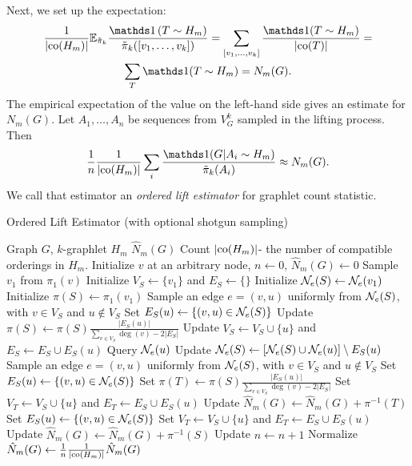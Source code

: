 	Next, we set up the expectation:
	\begin{multline*}
	    \frac{1}{|\co(H_m)|}\E_{\tilde \pi_k} \frac{\ind\left(T \sim H_m\right)}{\tilde\pi_k([v_1, \ldots, v_k])} = 
	    \sum_{[v_1, \ldots, v_k]} \frac{\ind(T \sim H_m)}{|\co(T)|} = \\
	    \sum_T \ind(T \sim H_m) = N_m(G).
	\end{multline*}
	The empirical expectation of the value on the left-hand side gives an estimate for $N_m(G)$.
	Let $A_1,\ldots,A_n$ be sequences from $V^k_G$ sampled in the lifting process.
	Then
	\begin{equation*}
	    \frac{1}{n}\frac{1}{|\co(H_m)|}\sum_{i} \frac{\ind(G|A_i \sim H_m)}{\tilde\pi_k(A_i)} \approx N_m(G).
	\end{equation*}
	We call that estimator an \textit{ordered lift estimator} for graphlet count statistic.
	
\begin{algorithm}[h]
\label{alg:OLE}
\caption{Ordered Lift Estimator (with optional shotgun sampling)}
\begin{algorithmic}
    \INPUT Graph $G$, $k$-graphlet $H_m$
    \OUTPUT $\hat N_m(G)$
    \STATE Count $|\mathrm{co}(H_m)|$- the number of compatible orderings in $H_m$.
    \STATE Initialize $v$ at an arbitrary node, $n \gets 0$, $\hat N_m(G) \gets 0$
        \STATE Sample $v_1$ from $\pi_1(v)$
        \STATE Initialize $V_S \gets \{v_1\}$ and $E_S \gets \{\}$
        \STATE Initialize $\mathcal{N}_e(S)\gets \mathcal{N}_e(v_1)$
        \STATE Initialize $\pi(S) \gets \pi_1(v_1)$
            \STATE Sample an edge $e=(v,u)$ uniformly from $\mathcal{N}_e(S)$, with $v\in V_S$ and $u\notin V_S$
            \STATE Set $E_S(u) \gets \{(v,u)\in \mathcal{N}_e(S)\}$
            \STATE Update $\pi(S)\gets \pi(S)\frac{|E_S(u)|}{\sum_{v\in V_S} \deg(v) - 2|E_S|}$
            \STATE Update $V_S\gets V_S\cup\{u\}$ and $E_S \gets E_S \cup E_S(u)$
            \STATE Query $\mathcal{N}_e(u)$
            \STATE Update $\mathcal{N}_e(S) \gets [\mathcal{N}_e(S)\cup\mathcal{N}_e(u)]\setminus E_S(u)$
        \ENDWHILE
            \STATE Sample an edge $e=(v,u)$ uniformly from $\mathcal{N}_e(S)$, with $v\in V_S$ and $u\notin V_S$
            \STATE Set $E_S(u) \gets \{(v,u)\in \mathcal{N}_e(S)\}$
            \STATE Set $\pi(T)\gets \pi(S)\frac{|E_S(u)|}{\sum_{v\in V_S} \deg(v) - 2|E_S|}$
            \STATE Set $V_T\gets V_S\cup\{u\}$ and $E_T \gets E_S\cup E_S(u)$
                \STATE Update $\hat N_m(G) \gets \hat N_m(G) + \pi^{-1}(T)$ 
            \ENDIF
        \ENDIF
                \STATE Set $E_S(u) \gets \{(v,u)\in \mathcal{N}_e(S)\}$
                \STATE Set $V_T\gets V_S\cup\{u\}$ and $E_T \gets E_S \cup E_S(u)$
                    \STATE Update $\hat N_m(G) \gets \hat N_m(G) + \pi^{-1}(S)$
                \ENDIF
            \ENDFOR
        \ENDIF
        \STATE Update $n \gets n + 1$
    \ENDWHILE
    \STATE Normalize $\hat N_m(G) \gets \frac{1}{n}\frac{1}{|\mathrm{co}(H_m)|}\hat N_m(G)$
\end{algorithmic}
\end{algorithm}
	
